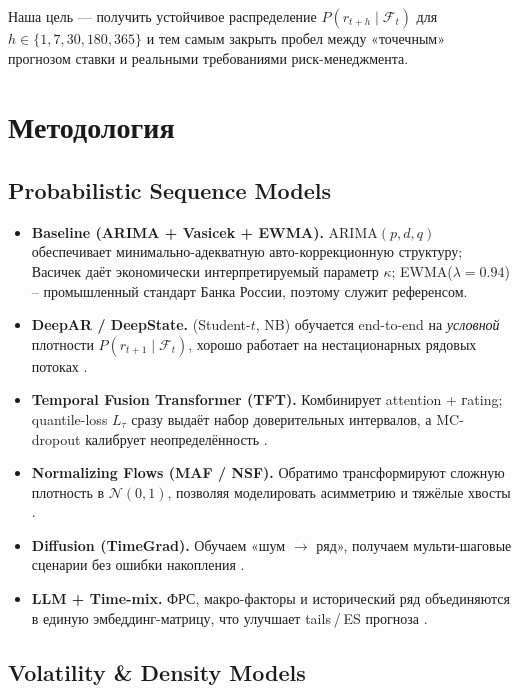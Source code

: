 Наша цель — получить устойчивое распределение
\(P(r_{t+h}\mid\mathcal F_t)\) для
\(h \in \{1,7,30,180,365\}\) и тем самым закрыть пробел между
«точечным» прогнозом ставки и реальными требованиями риск-менеджмента.


\section{Методология}

\subsection{Probabilistic Sequence Models}

\begin{itemize}
  \item \textbf{Baseline (ARIMA + Vasicek + EWMA).}  ARIMA$(p,d,q)$
        обеспечивает минимально-адекватную авто-коррекционную структуру;
        Васичек даёт экономически интерпретируемый
        параметр $\kappa$; EWMA($\lambda{=}0.94$) – промышленный
        стандарт Банка России, поэтому служит референсом.
  \item \textbf{DeepAR / DeepState.} (Student-$t$, NB) обучается end-to-end на
        \emph{условной} плотности $\!P(r_{t+1}\mid\mathcal F_t)$,
        хорошо работает на нестационарных рядовых потоках
        \autocite{salinas2020deepar}.
  \item \textbf{Temporal Fusion Transformer (TFT).}  Комбинирует
        attention + гating; quantile-loss $L_\tau$ сразу выдаёт набор
        доверительных интервалов, а MC-dropout калибрует 
        неопределённость \autocite{lim2024tft,vaswani2024transformers}.
  \item \textbf{Normalizing Flows (MAF / NSF).}  Обратимо
        трансформируют сложную плотность в $\mathcal N(0,1)$,
        позволяя моделировать асимметрию и тяжёлые хвосты
        \autocite{rasouli2023flows}.
  \item \textbf{Diffusion (TimeGrad).}  Обучаем «шум $\rightarrow$ ряд»,
        получаем мульти-шаговые сценарии без ошибки накопления
        \autocite{zangeneh2024diffusion}.
  \item \textbf{LLM + Time-mix.}  ФРС, макро-факторы и
        исторический ряд объединяются в единую эмбеддинг-матрицу,
        что улучшает tails / ES прогноза
        \autocite{gao2024fedspeak,chang2024forecasting}.
\end{itemize}

\subsection{Volatility \& Density Models}

